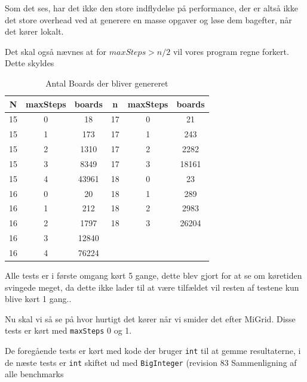 Som det ses, har det ikke den store indflydelse på performance, der er altså
ikke det store overhead ved at generere en masse opgaver og løse dem bagefter,
når det kører lokalt. 

Det skal også nævnes at for $maxSteps>n/2$ vil vores program regne forkert.
Dette skyldes 

\begin{table}
\begin{center}
\begin{tabular}{|c|c|c|c|c|c|}
\hline N & maxSteps & boards & n & maxSteps & boards \\
\hline 15 & 0 & 18 & 17 & 0 & 21\\
\hline 15 & 1 & 173 & 17 & 1 & 243\\
\hline 15 & 2 & 1310 & 17 & 2 & 2282 \\ 
\hline 15 & 3 & 8349 & 17 & 3 & 18161\\
\hline 15 & 4 & 43961 & 18 & 0 & 23   \\
\hline 16 & 0 & 20 &    18 & 1 & 289  \\
\hline 16 & 1 & 212 &   18 & 2 & 2983 \\
\hline 16 & 2 & 1797 &  18 & 3 & 26204\\
\hline 16 & 3 & 12840 & & &\\
\hline 16 & 4 & 76224 & & & \\
\hline
\end{tabular}
\caption{Antal Boards der bliver genereret}
\label{table:noboards}
\end{center}
\end{table}



Alle tests er i første omgang kørt 5 gange, dette blev gjort for at se om
køretiden svingede meget, da dette ikke lader til at være tilfældet vil resten
af testene kun blive kørt 1 gang.. 

Nu skal vi så se på hvor hurtigt det kører når vi smider det efter MiGrid. 
Disse tests er kørt med \texttt{maxSteps} 0 og 1.

De foregående tests er kørt med kode der bruger \texttt{int} til at gemme resultaterne,
i de næste tests er \texttt{int} skiftet ud med \texttt{BigInteger} (revision
83
\clearpage
Sammenligning af alle benchmarks

